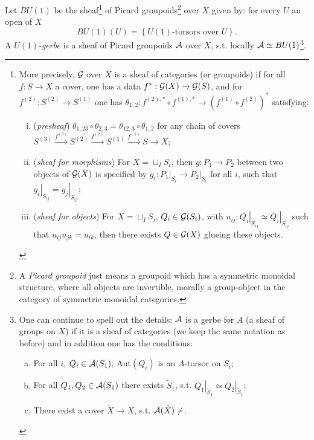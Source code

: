 \begin{defn}
Let $BU(1)$ be the sheaf\footnote{More precisely, $\mathcal{G}$ over $X$ is a
  sheaf of categories (or groupoids) if for all $f: S \rightarrow X$ a cover,
  one has a data $f^*:\mathcal{G}(X) \rightarrow \mathcal{G}(S)$, and for $f^{(2)}:S^{(2)} \rightarrow
  S^{(1)}$ one has $\theta_{1,2}:f^{(2),*}\circ f^{(1),*} \rightarrow \left(f^{(1)}\circ
    f^{(2)}\right)^*$ satisfying:
\begin{enumerate}[(i)]
\item (\textit{presheaf}) $\theta_{1,23}\circ\theta_{2,3} = \theta_{12,3}\circ
  \theta_{1,2}$ for any chain of covers $S^{(3)}\overset{f^{(3)}}{\rightarrow}
  S^{(2)}\overset{f^{(2)}}{\rightarrow}S^{(1)}\overset{f^{(1)}}{\rightarrow}S \rightarrow X$;
\item (\textit{sheaf for morphisms}) For $X = \sqcup_{I}S_i$, then
  $g:P_1 \rightarrow P_2$ between two objects of $\mathcal{G}(X)$ is specified by
  $g_i:\left.P_1\right|_{S_i}\rightarrow \left.P_2\right|_{S_i}$ for all $i$,
  such that $\left. g_i\right|_{S_{ij}} = \left.g_j\right|_{S_{ij}}$;
\item (\textit{sheaf for objects}) For $X = \sqcup_{I}S_i$, $Q_i \in
  \mathcal{G}(S_i)$, with $u_{ij}:\left.Q_i\right|_{S_{ij}}\simeq
  \left.Q_i\right|_{S_{ij}}$ such that $u_{ij}u_{jk} = u_{ik}$, then
  there exists $Q \in \mathcal{G}(X)$ glueing these objects.
\end{enumerate}
} of Picard
groupoids\footnote{A \emph{Picard groupoid} just means a groupoid
  which has a symmetric monoidal structure, where all objects are
  invertible, morally a group-object in the category of symmetric
  monoidal categories.} over $X$ given by: for every $U$ an open of
$X$
\[BU(1)(U) = \left\{U(1)\mbox{-torsors over }U\right\}.\]
A $U(1)$-\emph{gerbe} is a sheaf of Picard groupoids $\mathcal{A}$ over $X$,
s.t. locally $\mathcal{A} \simeq BU(1)$\footnote{One can continue to spell out
the details: $\mathcal{A}$ is a gerbe for $A$ (a sheaf of groups on $X$) if it
is a sheaf of categories (we keep the same notation as before) and in
addition one has the conditions:
\begin{enumerate}[a.]
\item For all $i$, $Q_i \in \mathcal{A}(S_1)$, $\mbox{Aut}(Q_i)$ is an
  $A$-torsor on $S_i$;
\item For all $Q_1,Q_2 \in \mathcal{A}(S_1)$ there exists $\tilde{S}_1$,
  s.t. $\left.Q_1\right|_{\tilde{S}_1}\simeq
  \left.Q_2\right|_{\tilde{S}_1}$;
\item There exist a cover $\tilde{X} \rightarrow X$,
  s.t. $\sA(\tilde{X}) \neq \empty$.
\end{enumerate}}.
\end{defn}


